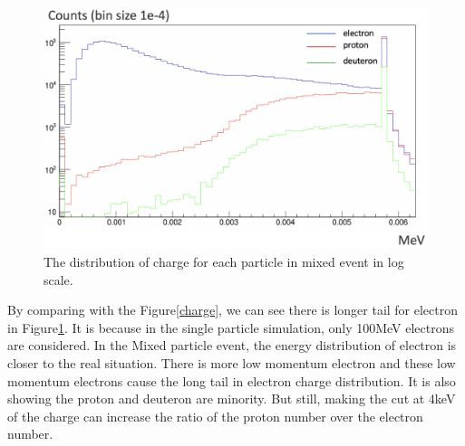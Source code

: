 \documentclass[12pt]{extarticle}
\begin{document}
\begin{figure}[H]
\centering
\includegraphics[width=0.9\linewidth]{figure/qsh_mixed.png}
\caption{The distribution of charge for each particle in mixed event in log scale.}
\label{charge2}
\end{figure}
\noindent 
By comparing with the Figure\ref{charge}, we can see there is longer tail for electron in Figure\ref{charge2}. It is because in the single particle simulation, only 100MeV electrons are considered. In the Mixed particle event, the energy distribution of electron is closer to the real situation. There is more low momentum electron and these low momentum electrons cause the long tail in electron charge distribution. It is also showing the proton and deuteron are minority. But still, making the cut at 4keV of the charge can increase the ratio of the proton number over the electron number.
\end{document}

